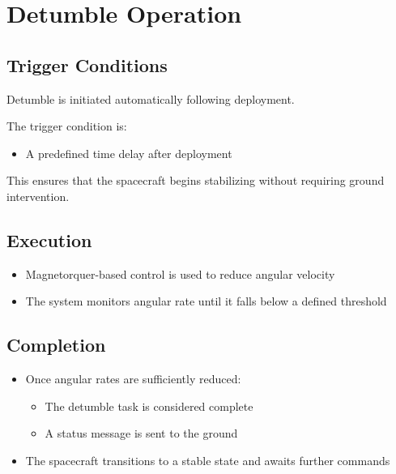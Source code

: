 \documentclass[letterpaper,11pt,oneside,english]{scrreprt}
\begin{document}
	
	\chapter{Detumble Operation}
	
	\section{Trigger Conditions}
	
	Detumble is initiated automatically following deployment.
	
	The trigger condition is:
	
	\begin{itemize}
		\item A predefined time delay after deployment
	\end{itemize}
	
	This ensures that the spacecraft begins stabilizing without requiring ground intervention.
	
	\section{Execution}
	
	\begin{itemize}
		\item Magnetorquer-based control is used to reduce angular velocity
		\item The system monitors angular rate until it falls below a defined threshold
	\end{itemize}
	
	\section{Completion}
	
	\begin{itemize}
		\item Once angular rates are sufficiently reduced:
		\begin{itemize}
			\item The detumble task is considered complete
			\item A status message is sent to the ground
		\end{itemize}
		
		\item The spacecraft transitions to a stable state and awaits further commands
	\end{itemize}
	
\end{document}
